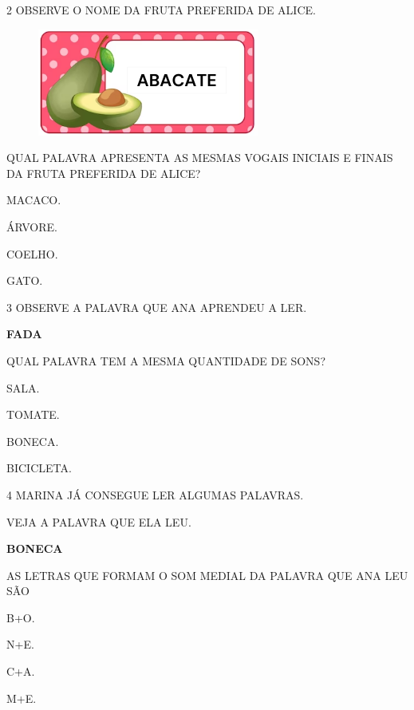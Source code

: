 \num{2} OBSERVE O NOME DA FRUTA PREFERIDA DE ALICE.

\begin{figure}[htpb!]
\centering
\includegraphics[width=.45\textwidth]{media/image212.png}
\end{figure}

\pagebreak
QUAL PALAVRA APRESENTA AS MESMAS VOGAIS INICIAIS E FINAIS DA FRUTA PREFERIDA DE ALICE?

\begin{escolha}
\item MACACO.

\item ÁRVORE.

\item COELHO.

\item GATO.
\end{escolha}


\num{3} OBSERVE A PALAVRA QUE ANA APRENDEU A LER.

\begin{myquote}
\textbf{FADA}
\end{myquote}

QUAL PALAVRA TEM A MESMA QUANTIDADE DE SONS?

\begin{escolha}
\item SALA.

\item TOMATE.

\item BONECA.

\item BICICLETA.
\end{escolha}


\num{4} MARINA JÁ CONSEGUE LER ALGUMAS PALAVRAS.

VEJA A PALAVRA QUE ELA LEU.

\begin{myquote}
\textbf{BONECA}
\end{myquote}

\pagebreak
AS LETRAS QUE FORMAM O SOM MEDIAL DA PALAVRA QUE ANA LEU SÃO

\begin{escolha}
\item B+O.

\item N+E.

\item C+A.

\item M+E.
\end{escolha}

